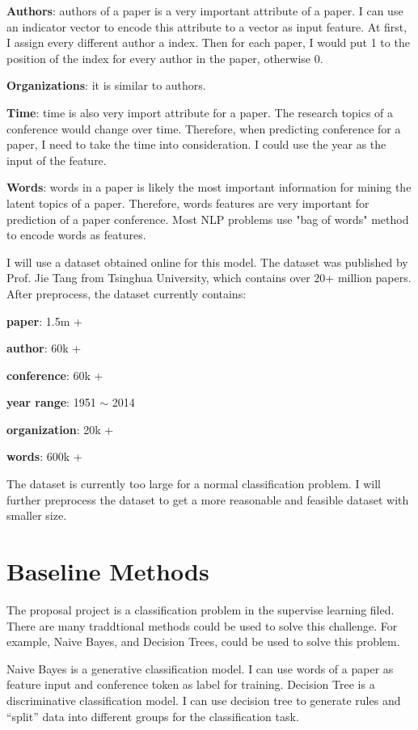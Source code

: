 \documentclass{article} %
\begin{document}
\textbf{Authors}: authors of a paper is a very important attribute of a paper. I
can use an indicator vector to encode this attribute to a vector as input
feature. At first, I assign every different author a index. Then for each paper, I would
put 1 to the position of the index for every author in the paper, otherwise 0.

\textbf{Organizations}: it is similar to authors.

\textbf{Time}: time is also very import attribute for a paper. The research topics of a
conference would change over time. Therefore, when predicting conference for a
paper, I need to take the time into consideration. I could use the year as
the input of the feature.

\textbf{Words}: words in a paper is likely the most important information for mining the
latent topics of a paper. Therefore, words features are very important for
prediction of a paper conference. Most NLP problems use "bag of words" method to
encode words as features.

I will use a dataset obtained online for this model. The dataset was published
by Prof. Jie Tang from Tsinghua University, which contains over 20+ million
papers. After preprocess, the dataset currently contains:

\textbf{paper}: 1.5m +

\textbf{author}: 60k +

\textbf{conference}: 60k +

\textbf{year range}: 1951 $\sim$ 2014

\textbf{organization}: 20k +

\textbf{words}: 600k +

The dataset is currently too large for a normal classification problem. I will
further preprocess the dataset to get a more reasonable and feasible dataset
with smaller size.

\section{Baseline Methods}
The proposal project is a classification problem in the supervise learning
filed. There are many traddtional methods could be used to solve this challenge.
For example, Naive Bayes, and Decision Trees, could be used to solve this problem.

Naive Bayes is a generative classification model. I can use words of a paper as
feature input and conference token as label for training. Decision Tree is a
discriminative classification model. I can use decision tree to generate rules
and ``split'' data into different groups for the classification task.
\end{document}
